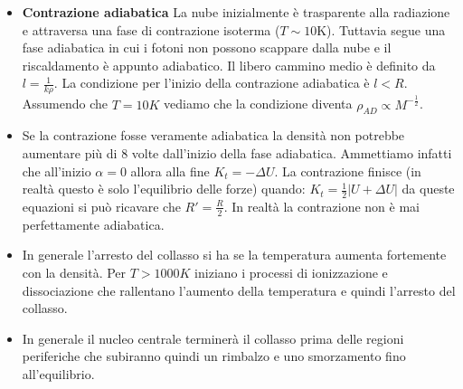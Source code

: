 \documentclass[11pt,a4paper]{article}
\begin{document}
\begin{itemize}
\item \textbf{Contrazione adiabatica} La nube inizialmente è trasparente alla radiazione e attraversa una fase di contrazione isoterma ($T \sim 10 \si{\kelvin}$). Tuttavia segue una fase adiabatica in cui i fotoni non possono scappare dalla nube e il riscaldamento è appunto adiabatico. Il libero cammino medio è definito da $l = \frac{1}{k \rho}$. La condizione per l'inizio della contrazione adiabatica è $l < R$. Assumendo che $T = 10 K$ vediamo che la condizione diventa $\rho_{AD} \propto M^{-\frac{1}{2}}$. 

\item Se la contrazione fosse veramente adiabatica la densità non potrebbe aumentare più di $8$ volte dall'inizio della fase adiabatica. Ammettiamo infatti che all'inizio $\alpha = 0$ allora alla fine $K_t = - \Delta U$. La contrazione finisce (in realtà questo è solo l'equilibrio delle forze) quando: $K_t = \frac{1}{2} | U + \Delta U |$ da queste equazioni si può ricavare che $R' = \frac{R}{2}$. In realtà la contrazione non è mai perfettamente adiabatica.

\item In generale l'arresto del collasso si ha se la temperatura aumenta fortemente con la densità. Per $T > 1000 K$ iniziano i processi di ionizzazione e dissociazione che rallentano l'aumento della temperatura e quindi l'arresto del collasso.

\item In generale il nucleo centrale terminerà il collasso prima delle regioni periferiche che subiranno quindi un rimbalzo e uno smorzamento fino all'equilibrio.

\end{itemize}
\end{document}
